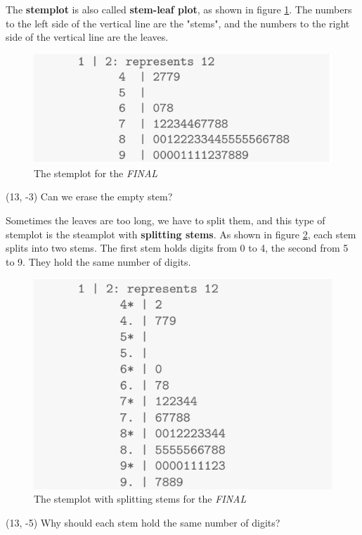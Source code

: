 \documentclass[a4paper, 12pt,twoside]{book}
\begin{document}
\begin{itemize}
The \textbf{stemplot} is also called \textbf{stem-leaf plot}, as shown in figure \ref{Stemplot}. The numbers to the left side of the vertical line are the "stems", and the numbers to the right side of the vertical line are the leaves.
\begin{figure}[H]
\centering
\includegraphics[scale=0.6]{Stemplot.png}
\caption{The stemplot for the \textit{FINAL}}
\label{Stemplot}
\end{figure}
\begin{textblock}{5}(13, -3)
\noindent Can we erase the empty stem? 
\end{textblock}
\noindent Sometimes the leaves are too long, we have to split them, and this type of stemplot is the steamplot with \textbf{splitting stems}. As shown in figure \ref{StemplotSplittingStems}, each stem splits into two stems. The first stem holds digits from 0 to 4, the second from 5 to 9. They hold the same number of digits.
\begin{figure}[H]
\centering
\includegraphics[scale=0.6]{StemplotSplittingStems.png}
\caption{The stemplot with splitting stems for the \textit{FINAL}}
\label{StemplotSplittingStems}
\end{figure}
\begin{textblock}{5}(13, -5)
\noindent Why should each stem hold the same number of digits? 
\end{textblock}
\vspace{0.6cm}
\newpage


\end{itemize}
\end{document}
